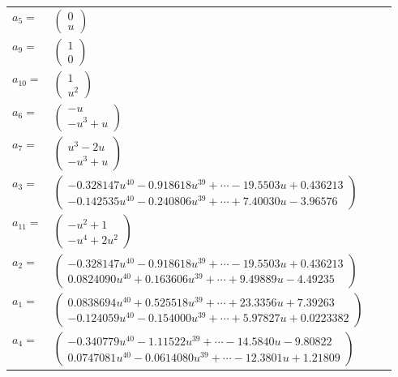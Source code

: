 \documentclass[1p]{elsarticle_modified}
\theoremstyle{definition}
\begin{document}
\begin{tabular}{m{7pt} m{180pt} m{7pt} m{180pt} }
\flushright $a_{5}=$&$\begin{pmatrix}0\\u\end{pmatrix}$ \\
\flushright $a_{9}=$&$\begin{pmatrix}1\\0\end{pmatrix}$ \\
\flushright $a_{10}=$&$\begin{pmatrix}1\\u^2\end{pmatrix}$ \\
\flushright $a_{6}=$&$\begin{pmatrix}- u\\- u^3+u\end{pmatrix}$ \\
\flushright $a_{7}=$&$\begin{pmatrix}u^3-2 u\\- u^3+u\end{pmatrix}$ \\
\flushright $a_{3}=$&$\begin{pmatrix}-0.328147 u^{40}-0.918618 u^{39}+\cdots-19.5503 u+0.436213\\-0.142535 u^{40}-0.240806 u^{39}+\cdots+7.40030 u-3.96576\end{pmatrix}$ \\
\flushright $a_{11}=$&$\begin{pmatrix}- u^2+1\\- u^4+2 u^2\end{pmatrix}$ \\
\flushright $a_{2}=$&$\begin{pmatrix}-0.328147 u^{40}-0.918618 u^{39}+\cdots-19.5503 u+0.436213\\0.0824090 u^{40}+0.163606 u^{39}+\cdots+9.49889 u-4.49235\end{pmatrix}$ \\
\flushright $a_{1}=$&$\begin{pmatrix}0.0838694 u^{40}+0.525518 u^{39}+\cdots+23.3356 u+7.39263\\-0.124059 u^{40}-0.154000 u^{39}+\cdots+5.97827 u+0.0223382\end{pmatrix}$ \\
\flushright $a_{4}=$&$\begin{pmatrix}-0.340779 u^{40}-1.11522 u^{39}+\cdots-14.5840 u-9.80822\\0.0747081 u^{40}-0.0614080 u^{39}+\cdots-12.3801 u+1.21809\end{pmatrix}$ \\

\end{tabular}
\end{document}

